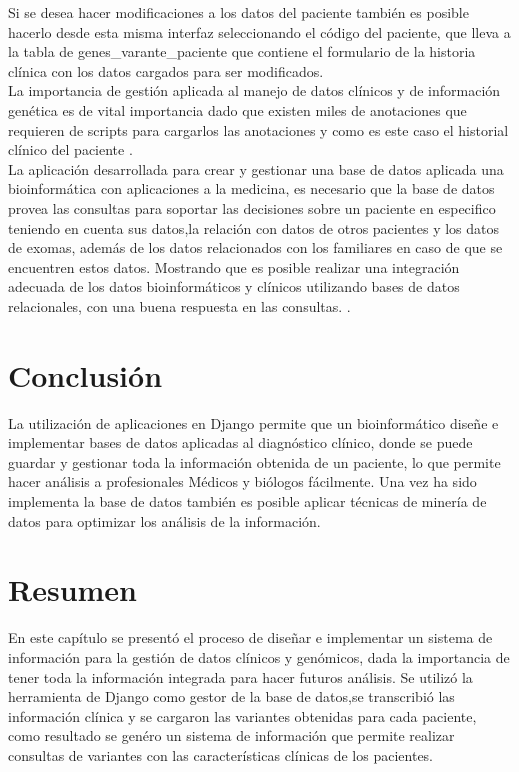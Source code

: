 Si se desea hacer modificaciones a los datos del paciente también es posible hacerlo desde esta misma interfaz seleccionando el código del paciente, que lleva a la tabla de genes\_varante\_paciente que contiene el formulario de la historia clínica con los datos cargados para ser modificados. \\

La importancia de gestión aplicada al manejo de datos clínicos y de información genética es de vital importancia dado que existen miles de anotaciones que requieren de scripts para cargarlos las anotaciones y como es este caso el historial clínico del paciente \cite{Paila2013}. \\

La aplicación desarrollada para crear y gestionar una base de datos aplicada una bioinformática con aplicaciones a la medicina, es necesario que la base de datos provea las consultas para soportar las decisiones sobre un paciente en especifico teniendo en cuenta sus datos,la relación con datos de otros pacientes y los datos de exomas, además de los datos relacionados con los familiares en caso de que se encuentren estos datos. Mostrando que es posible realizar una integración adecuada de los datos bioinformáticos y clínicos utilizando bases de datos relacionales, con una buena respuesta en las consultas. \cite{Sujansky2001}.

\section{Conclusión}

La utilización de aplicaciones en Django permite que un bioinformático diseñe e implementar bases de datos aplicadas al diagnóstico clínico, donde se puede guardar y gestionar toda la información obtenida de un paciente, lo que permite hacer análisis a profesionales Médicos y biólogos fácilmente. Una vez ha sido implementa la base de datos también es posible aplicar técnicas de minería de datos para optimizar los análisis de la información. \\

\section*{Resumen}

En este capítulo se presentó el proceso de diseñar e implementar un sistema de información para la gestión de datos clínicos y genómicos, dada la importancia de tener toda la información integrada para hacer futuros análisis. Se utilizó la herramienta de Django como gestor de la base de datos,se transcribió las información clínica y se cargaron las variantes obtenidas para cada paciente, como resultado se genéro un sistema de información que permite realizar consultas de variantes con las características clínicas de los pacientes.   
